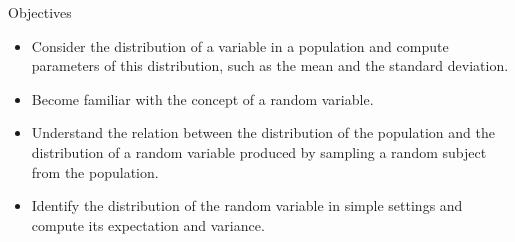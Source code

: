 \documentclass[10pt]{beamer}\usepackage[]{graphicx}\usepackage[]{color}
\begin{document}
\begin{frame}{Objectives}
	
	\begin{itemize}[<+->]
		
		\item    Consider the distribution of a variable in a population and compute
		parameters of this distribution, such as the mean and the standard
		deviation.
		
		\item   Become familiar with the concept of a random variable.
		
		\item    Understand the relation between the distribution of the population
		and the distribution of a random variable produced by sampling a
		random subject from the population.
		
		\item    Identify the distribution of the random variable in simple settings
		and compute its expectation and variance.
	\end{itemize}
	
\end{frame}
\end{document}
